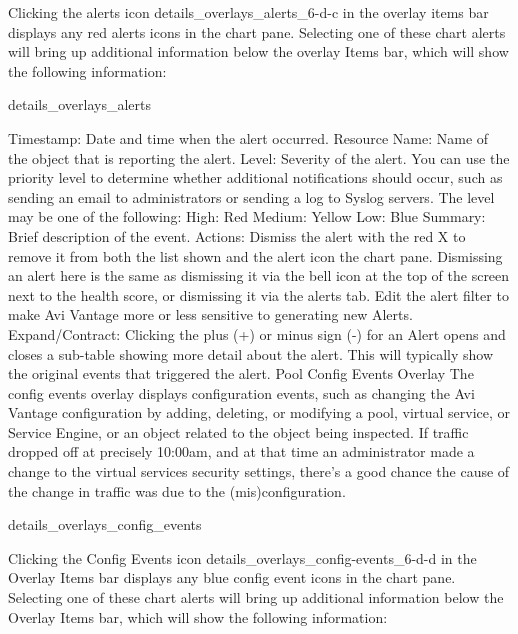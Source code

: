 \documentclass[letterpaper,10pt,english]{sphinxmanual}
\begin{document}
Clicking the alerts icon details\_overlays\_alerts\_6-d-c in the overlay items bar displays any red alerts icons in the chart pane. Selecting one of these chart alerts will bring up additional information below the overlay Items bar, which will show the following information:

details\_overlays\_alerts

Timestamp: Date and time when the alert occurred.
Resource Name: Name of the object that is reporting the alert.
Level: Severity of the alert. You can use the priority level to determine whether additional notifications should occur, such as sending an email to administrators or sending a log to Syslog servers. The level may be one of the following:
High: Red
Medium: Yellow
Low: Blue
Summary: Brief description of the event.
Actions:
Dismiss the alert with the red X to remove it from both the list shown and the alert icon the chart pane. Dismissing an alert here is the same as dismissing it via the bell icon at the top of the screen next to the health score, or dismissing it via the alerts tab.
Edit the alert filter to make Avi Vantage more or less sensitive to generating new Alerts.
Expand/Contract: Clicking the plus (+) or minus sign (-) for an Alert opens and closes a sub-table showing more detail about the alert. This will typically show the original events that triggered the alert.
Pool Config Events Overlay
The config events overlay displays configuration events, such as changing the Avi Vantage configuration by adding, deleting, or modifying a pool, virtual service, or Service Engine, or an object related to the object being inspected. If traffic dropped off at precisely 10:00am, and at that time an administrator made a change to the virtual services security settings, there's a good chance the cause of the change in traffic was due to the (mis)configuration.

details\_overlays\_config\_events

Clicking the Config Events icon details\_overlays\_config-events\_6-d-d in the Overlay Items bar displays any blue config event icons in the chart pane. Selecting one of these chart alerts will bring up additional information below the Overlay Items bar, which will show the following information:
\end{document}

